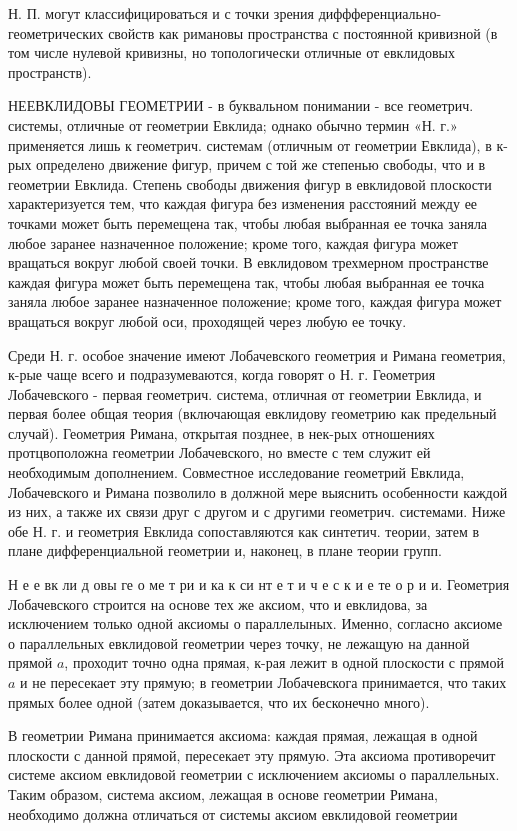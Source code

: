 \documentclass[10pt]{article}
\begin{document}
Н. П. могут классифицироваться и с точки зрения диффференциально-геометрических свойств как римановы пространства с постоянной кривизной (в том числе нулевой кривизны, но топологически отличные от евклидовых пространств).



НЕЕВКЛИДОВЫ ГЕОМЕТРИИ - в буквальном понимании - все геометрич. системы, отличные от геометрии Евклида; однако обычно термин «Н. г.» применяется лишь к геометрич. системам (отличным от геометрии Евклида), в к-рых определено движение фигур, причем с той же степенью свободы, что и в геометрии Евклида. Степень свободы движения фигур в евклидовой плоскости характеризуется тем, что каждая фигура без изменения расстояний между ее точками может быть перемещена так, чтобы любая выбранная ее точка заняла любое заранее назначенное положение; кроме того, каждая фигура может вращаться вокруг любой своей точки. В евклидовом трехмерном пространстве каждая фигура может быть перемещена так, чтобы любая выбранная ее точка заняла любое заранее назначенное положение; кроме того, каждая фигура может вращаться вокруг любой оси, проходящей через любую ее точку.



Среди Н. г. особое значение имеют Лобачевского геометрия и Римана геометрия, к-рые чаще всего и подразумеваются, когда говорят о Н. г. Геометрия Лобачевского - первая геометрич. система, отличная от геометрии Евклида, и первая более общая теория (включающая евклидову геометрию как предельный случай). Геометрия Римана, открытая позднее, в нек-рых отношениях протцвоположна геометрии Лобачевского, но вместе с тем служит ей необходимым дополнением. Совместное исследование геометрий Евклида, Лобачевского и Римана позволило в должной мере выяснить особенности каждой из них, а также их связи друг с другом и с другими геометрич. системами. Ниже обе Н. г. и геометрия Евклида сопоставляются как синтетич. теории, затем в плане дифференциальной геометрии и, наконец, в плане теории групп.



Н е е вк ли д овы ге о ме т ри и ка к си нт е т и ч е с к и е те о р и и. Геометрия Лобачевского строится на основе тех же аксиом, что и евклидова, за исключением только одной аксиомы о параллелыных. Именно, согласно аксиоме о параллельных евклидовой геометрии через точку, не лежащую на данной прямой $a$, проходит точно одна прямая, к-рая лежит в одной плоскости с прямой $a$ и не пересекает эту прямую; в геометрии Лобачевскога принимается, что таких прямых более одной (затем доказывается, что их бесконечно много).



В геометрии Римана принимается аксиома: каждая прямая, лежащая в одной плоскости с данной прямой, пересекает эту прямую. Эта аксиома противоречит системе аксиом евклидовой геометрии с исключением аксиомы о параллельных. Таким образом, система аксиом, лежащая в основе геометрии Римана, необходимо должна отличаться от системы аксиом евклидовой геометрии
\end{document}
